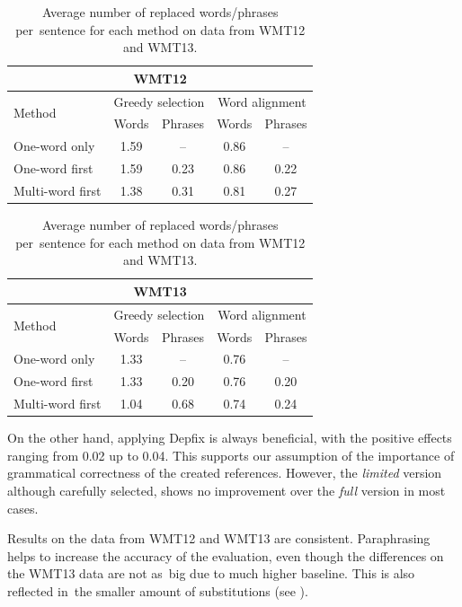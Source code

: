 \begin{table}[htb]
\begin{center}
\begin{tabular}{l|cc|cc}
\multicolumn{5}{c}{\textbf{WMT12}}\\
\hline
\multirow{2}{*}{Method} & \multicolumn{2}{c|}{Greedy selection} & \multicolumn{2}{c}{Word alignment} \\
& Words & Phrases & Words & Phrases \\
\hline
One-word only     & 1.59 & --   & 0.86 &  --  \\
One-word first    & 1.59 & 0.23 & 0.86 & 0.22 \\
Multi-word first  & 1.38 & 0.31 & 0.81 & 0.27 \\
\end{tabular}
\vspace{10pt}
\begin{tabular}{l|cc|cc}
\multicolumn{5}{c}{\textbf{WMT13}}\\
\hline
\multirow{2}{*}{Method} & \multicolumn{2}{c|}{Greedy selection} & \multicolumn{2}{c}{Word alignment} \\
& Words & Phrases & Words & Phrases \\
\hline
One-word only    & 1.33 &  --  & 0.76 & --   \\
One-word first   & 1.33 & 0.20 & 0.76 & 0.20 \\
Multi-word first & 1.04 & 0.68 & 0.74 & 0.24 \\
\end{tabular}

\caption{Average number of replaced words/phrases per~sentence for each method 
on data from WMT12 and WMT13.}
\label{substitutions:12:13}
\end{center}
\end{table}

On the other hand, applying Depfix is always beneficial, with the positive 
effects ranging from 0.02 up to 0.04. This supports our assumption of the 
importance of grammatical correctness of the created references. However, 
the \textit{limited} version although carefully selected, shows no improvement
over the \textit{full} version in most cases.

Results on the data from WMT12 and WMT13 are consistent. Paraphrasing 
helps to increase the accuracy of the evaluation, even though the differences on 
the WMT13 data are not as~big due to much higher baseline. This is also reflected 
in~the smaller amount of substitutions (see ).

